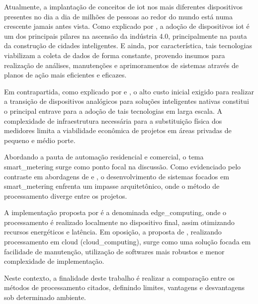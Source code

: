 Atualmente, a implantação de conceitos de \gls{iot} nos mais diferentes dispositivos presentes 
no dia a dia de milhões de pessoas ao redor do mundo está numa crescente jamais antes vista. 
Como explicado por , a adoção de dispositivos \gls{iot} é um dos principais
pilares na ascensão da indústria 4.0, principalmente na pauta da construção de cidades inteligentes. 
E ainda, por característica, tais tecnologias viabilizam a coleta de dados de forma constante, provendo insumos para realização
de análises, manutenções e aprimoramentos de sistemas através de planos de ação mais eficientes e eficazes. 

Em contrapartida, como explicado por  e , 
o alto custo inicial exigido para realizar a transição de dispositivos analógicos para soluções inteligentes nativas
constitui o principal entrave para a adoção de tais tecnologias em larga escala. 
A complexidade de infraestrutura necessária para a substituição física dos medidores limita a viabilidade econômica de projetos 
em áreas privadas de pequeno e médio porte. 

Abordando a pauta de automação residencial e comercial, 
o tema \gls{smart_metering} surge como ponto focal na discussão. 
Como evidenciado pelo contraste em abordagens de  e , 
o desenvolvimento de sistemas focados em \gls{smart_metering}
enfrenta um impasse arquitetônico, 
onde o método de processamento diverge entre os projetos.

A implementação proposta por  é a denominada \gls{edge_computing}, 
onde o processamento é realizado localmente no dispositivo final, 
assim otimizando recursos energéticos e latência. 
Em oposição, a proposta de , realizando processamento em cloud (\gls{cloud_computing}), 
surge como uma solução focada em facilidade de manutenção, 
utilização de softwares mais robustos e menor complexidade de implementação.

Neste contexto, a finalidade deste trabalho é realizar 
a comparação entre os métodos de processamento citados, 
definindo limites, vantagens e desvantagens sob determinado ambiente.
